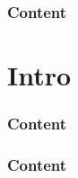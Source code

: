 


\maketitle

%


\begin{frame} \frametitle{Content} \tableofcontents \end{frame}
\section{Intro} %
\label{sec:Intro}


\begin{frame} \frametitle{Content} \tableofcontents \end{frame} 

% 
\begin{frame} \frametitle{Content} \tableofcontents \end{frame}




